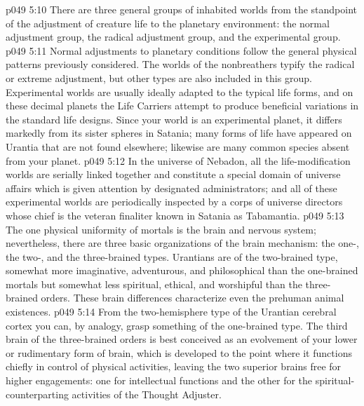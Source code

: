 \vs p049 5:10 \bibnobreakspace {} There are three general groups of inhabited worlds from the standpoint of the adjustment of creature life to the planetary environment: the normal adjustment group, the radical adjustment group, and the experimental group.
\vs p049 5:11 Normal adjustments to planetary conditions follow the general physical patterns previously considered. The worlds of the nonbreathers typify the radical or extreme adjustment, but other types are also included in this group. Experimental worlds are usually ideally adapted to the typical life forms, and on these decimal planets the Life Carriers attempt to produce beneficial variations in the standard life designs. Since your world is an experimental planet, it differs markedly from its sister spheres in Satania; many forms of life have appeared on Urantia that are not found elsewhere; likewise are many common species absent from your planet.
\vs p049 5:12 In the universe of Nebadon, all the life\hyp{}modification worlds are serially linked together and constitute a special domain of universe affairs which is given attention by designated administrators; and all of these experimental worlds are periodically inspected by a corps of universe directors whose chief is the veteran finaliter known in Satania as Tabamantia.
\vs p049 5:13 \bibnobreakspace {} The one physical uniformity of mortals is the brain and nervous system; nevertheless, there are three basic organizations of the brain mechanism: the one-, the two-, and the three\hyp{}brained types. Urantians are of the two\hyp{}brained type, somewhat more imaginative, adventurous, and philosophical than the one\hyp{}brained mortals but somewhat less spiritual, ethical, and worshipful than the three\hyp{}brained orders. These brain differences characterize even the prehuman animal existences.
\vs p049 5:14 From the two\hyp{}hemisphere type of the Urantian cerebral cortex you can, by analogy, grasp something of the one\hyp{}brained type. The third brain of the three\hyp{}brained orders is best conceived as an evolvement of your lower or rudimentary form of brain, which is developed to the point where it functions chiefly in control of physical activities, leaving the two superior brains free for higher engagements: one for intellectual functions and the other for the spiritual\hyp{}counterparting activities of the Thought Adjuster.
